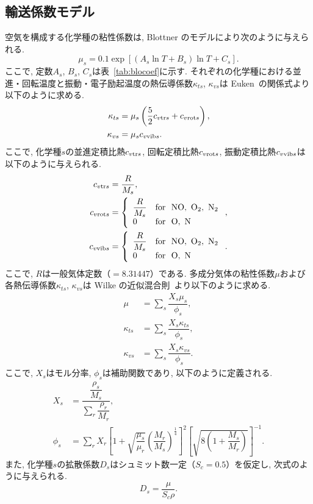 \subsection{輸送係数モデル}
空気を構成する化学種の粘性係数は,
Blottner のモデル\cite{blottner1971chemically}により次のように与えられる.
\begin{equation}
\mu_s=0.1\exp\left[\left(A_s\ln T+B_s\right)\ln T+C_s\right].
\end{equation}
ここで,
定数$A_s$, $B_s$, $C_s$は表~\ref{tab:blocoef}に示す.
それぞれの化学種における並進・回転温度と振動・電子励起温度の熱伝導係数$\kappa_{ts}$, $\kappa_{vs}$は Euken~\cite{kruger1965introduction}の関係式より以下のように求める.
\begin{align}
\kappa_{ts} &=\mu_s \left( \dfrac{5}{2} c_{v{\rm tr}s}+c_{v{\rm rot}s} \right), \\
\kappa_{vs} &=\mu_s c_{v{\rm vib}s}.
\end{align}
ここで,
化学種$s$の並進定積比熱$c_{v{\rm tr}s}$,
回転定積比熱$c_{v{\rm rot}s}$,
振動定積比熱$c_{v{\rm vib}s}$は以下のように与えられる.
\begin{align}
c_{v{\rm tr}s}  &=\dfrac{R}{M_s},\\
c_{v{\rm rot}s} &=\left\{ 
                   \begin{array}{ll}
                      \dfrac{R}{M_s} & {\rm for~\ NO,\ O_2,\ N_2}         \\
                      0 & {\rm for~\ O,\ N}       
                   \end{array} \right.,\\
c_{v{\rm vib}s} &=\left\{ \begin{array}{ll}
                      \dfrac{R}{M_s} & {\rm for~\ NO,\ O_2,\ N_2}         \\
                      0 & {\rm for~\ O,\ N}       
              \end{array} \right. .
\end{align}
ここで,
$R$は一般気体定数（$=8.31447$）である.
多成分気体の粘性係数$\mu$および各熱伝導係数$\kappa_{ts}$, $\kappa_{vs}$は Wilke の近似混合則~\cite{wilke1950viscosity}より以下のように求める.
\begin{align}
\mu &=\sum_{s}\dfrac{X_{s}\mu_{s}}{\phi_{s}},\\
\kappa_{ts} &=\sum_{s}\dfrac{X_{s}\kappa_{ts}}{\phi_{s}},\\
\kappa_{vs} &=\sum_{s}\dfrac{X_{s}\kappa_{vs}}{\phi_{s}}.
\end{align}
ここで,
$X_s$はモル分率,
$\phi_s$は補助関数であり,
以下のように定義される.
\begin{align}
X_s &=\dfrac{\dfrac{\rho_s}{M_s}}{\sum_{r}\dfrac{\rho_r}{M_r}} ,\\
\phi_s &=\sum_{r}X_r \left[ 1+\sqrt{\dfrac{\mu_s}{\mu_r}} \left( \dfrac{M_r}{M_s} \right )^{\frac{1}{4}} \right]^2 \left[ \sqrt{8 \left( 1+ \dfrac{M_s}{M_r}\right)} \right]^{-1}.
\end{align}
また,
化学種$s$の拡散係数$D_s$はシュミット数一定（$S_c =0.5$）を仮定し,
次式のように与えられる.
\begin{equation}
D_s=\dfrac{\mu}{S_{c}\rho}.
\end{equation}

